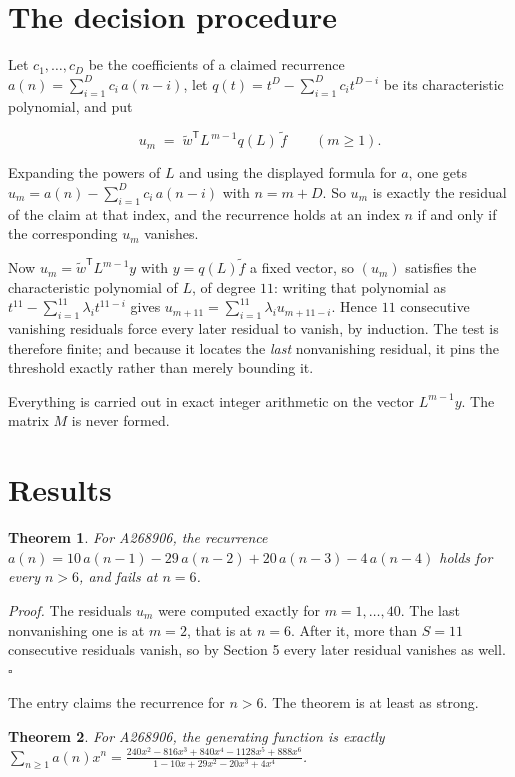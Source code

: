 \documentclass[11pt]{article}
\newtheorem{theorem}{Theorem}
\theoremstyle{definition}
\begin{document}
\section{The decision procedure}

Let $c_1,\dots,c_D$ be the coefficients of a claimed recurrence $a(n) = \sum_{i=1}^{D} c_i\,a(n-i)$, let $q(t) = t^{D} - \sum_{i=1}^{D} c_i t^{D-i}$ be its characteristic polynomial, and put

\[u_m \;=\; \tilde w^{\mathsf T} L^{\,m-1} q(L)\,\tilde f \qquad (m \ge 1).\]

Expanding the powers of $L$ and using the displayed formula for $a$, one gets $u_m = a(n) - \sum_{i=1}^{D} c_i\,a(n-i)$ with $n = m + D$. So $u_m$ is exactly the residual of the claim at that index, and the recurrence holds at an index $n$ if and only if the corresponding $u_m$ vanishes.

Now $u_m = \tilde w^{\mathsf T} L^{m-1} y$ with $y = q(L)\tilde f$ a fixed vector, so $(u_m)$ satisfies the characteristic polynomial of $L$, of degree $11$: writing that polynomial as $t^{11} - \sum_{i=1}^{11} \lambda_i t^{11-i}$ gives $u_{m+11} = \sum_{i=1}^{11} \lambda_i u_{m+11-i}$. Hence $11$ consecutive vanishing residuals force every later residual to vanish, by induction. The test is therefore finite; and because it locates the {\itshape last} nonvanishing residual, it pins the threshold exactly rather than merely bounding it.

Everything is carried out in exact integer arithmetic on the vector $L^{m-1}y$. The matrix $M$ is never formed.

\section{Results}

\begin{theorem} For A268906, the recurrence $a(n) = 10\,a(n-1) - 29\,a(n-2) + 20\,a(n-3) - 4\,a(n-4)$ holds for every $n > 6$, and fails at $n = 6$.\end{theorem}

{\itshape Proof.} The residuals $u_m$ were computed exactly for $m = 1,\dots,40$. The last nonvanishing one is at $m = 2$, that is at $n = 6$. After it, more than $S = 11$ consecutive residuals vanish, so by Section 5 every later residual vanishes as well. $\square$

The entry claims the recurrence for $n > 6$. The theorem is at least as strong.

\begin{theorem} For A268906, the generating function is exactly $\sum_{n\ge 1} a(n)x^n = \frac{240x^{2} - 816x^{3} + 840x^{4} - 1128x^{5} + 888x^{6}}{1 - 10x + 29x^{2} - 20x^{3} + 4x^{4}}$.\end{theorem}
\end{document}
